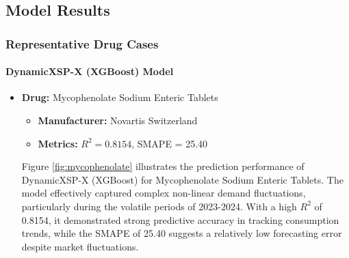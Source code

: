 \documentclass[12pt]{article}
\begin{document}
\subsection{Model Results}
\subsubsection{Representative Drug Cases}

\paragraph{DynamicXSP-X (XGBoost) Model} 
\begin{itemize}
\item \textbf{Drug:} Mycophenolate Sodium Enteric Tablets
\begin{itemize}
\item \textbf{Manufacturer:} Novartis Switzerland
\item \textbf{Metrics:} $R^2 = 0.8154$, SMAPE = 25.40
\end{itemize}

Figure \ref{fig:mycophenolate} illustrates the prediction performance of DynamicXSP-X (XGBoost) for Mycophenolate Sodium Enteric Tablets. The model effectively captured complex non-linear demand fluctuations, particularly during the volatile periods of 2023-2024. With a high $R^2$ of 0.8154, it demonstrated strong predictive accuracy in tracking consumption trends, while the SMAPE of 25.40 suggests a relatively low forecasting error despite market fluctuations.


\end{itemize}
\end{document}
